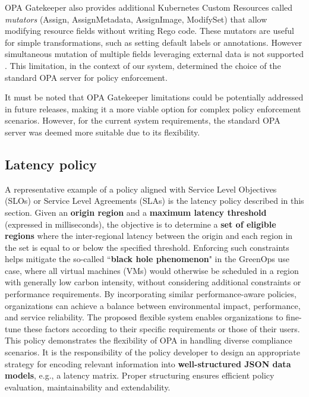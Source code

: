 OPA Gatekeeper also provides additional Kubernetes Custom Resources called \textit{mutators} (Assign, AssignMetadata, AssignImage, ModifySet) that allow modifying resource fields without writing Rego code. These mutators are useful for simple transformations, such as setting default labels or annotations. However simultaneous mutation of multiple fields leveraging external data is not supported \cite{opa_gatekeeper_external_data}. This limitation, in the context of our system, determined the choice of the standard OPA server for policy enforcement.

It must be noted that OPA Gatekeeper limitations could be potentially addressed in future releases, making it a more viable option for complex policy enforcement scenarios. However, for the current system requirements, the standard OPA server was deemed more suitable due to its flexibility.

\subsection{Latency policy}

A representative example of a policy aligned with Service Level Objectives (SLOs) or Service Level Agreements (SLAs) is the latency policy described in this section.
Given an \textbf{origin region} and a \textbf{maximum latency threshold} (expressed in milliseconds), the objective is to determine a \textbf{set of eligible regions} where the inter-regional latency between the origin and each region in the set is equal to or below the specified threshold.
Enforcing such constraints helps mitigate the so-called ``\textbf{black hole phenomenon}" in the GreenOps use case, where all virtual machines (VMs) would otherwise be scheduled in a region with generally low carbon intensity, without considering additional constraints or performance requirements. By incorporating similar performance-aware policies, organizations can achieve a balance between environmental impact, performance, and service reliability.
The proposed flexible system enables organizations to fine-tune these factors according to their specific requirements or those of their users. 
This policy demonstrates the flexibility of OPA in handling diverse compliance scenarios. It is the responsibility of the policy developer to design an appropriate strategy for encoding relevant information into \textbf{well-structured JSON data models}, e.g., a latency matrix. Proper structuring ensures efficient policy evaluation, maintainability and extendability.

